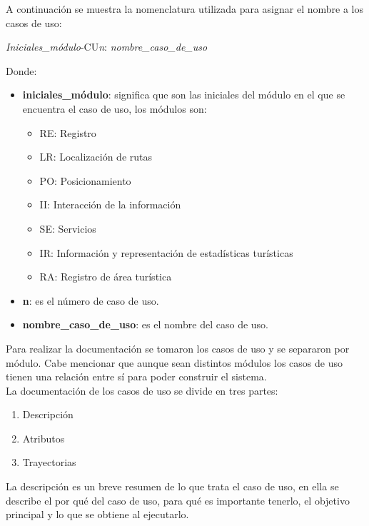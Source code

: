 \newpage
A continuación se muestra la nomenclatura utilizada para asignar el nombre a los casos de uso:

\begin{center}
	\Huge{\textit{Iniciales\_módulo}-CU\textit{n}: \textit{nombre\_caso\_de\_uso}}
\end{center}

Donde: 

\begin{itemize}
	\item \textbf{iniciales\_módulo}: significa que son las iniciales del módulo en el que se encuentra el caso de uso, los módulos son: 
	\begin{itemize}
		\item RE: Registro
		\item LR: Localización de rutas
		\item PO: Posicionamiento
		\item II: Interacción de la información
		\item SE: Servicios
		\item IR: Información y representación de estadísticas turísticas
		\item RA: Registro de área turística
	\end{itemize}

	\item \textbf{n}: es el número de caso de uso.
	
	\item \textbf{nombre\_caso\_de\_uso}: es el nombre del caso de uso.
\end{itemize}

Para realizar la documentación se tomaron los casos de uso y se separaron por módulo. Cabe mencionar que aunque sean distintos módulos los casos de uso tienen una relación entre sí para poder construir el sistema. \\

La documentación de los casos de uso se divide en tres partes:

\begin{enumerate}
	\item Descripción
	\item Atributos
	\item Trayectorias
\end{enumerate}

La descripción es un breve resumen de lo que trata el caso de uso, en ella se describe el por qué del caso de uso, para qué es importante tenerlo, el objetivo principal y lo que se obtiene al ejecutarlo.\\


